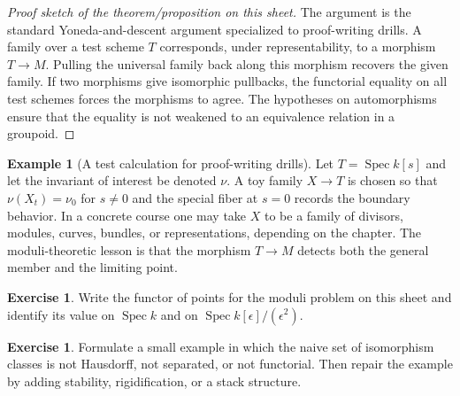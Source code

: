 \documentclass[11pt]{amsart}
\theoremstyle{definition}
\newtheorem{example}[theorem]{Example}
\newtheorem{exercise}[theorem]{Exercise}
\newcommand{\Spec}{\operatorname{Spec}}
\begin{document}
\begin{proof}[Proof sketch of the theorem/proposition on this sheet]
The argument is the standard Yoneda-and-descent argument specialized to proof-writing drills.  A family over a test scheme $T$ corresponds, under representability, to a morphism $T\to M$.  Pulling the universal family back along this morphism recovers the given family.  If two morphisms give isomorphic pullbacks, the functorial equality on all test schemes forces the morphisms to agree.  The hypotheses on automorphisms ensure that the equality is not weakened to an equivalence relation in a groupoid.
\end{proof}
\begin{example}[A test calculation for proof-writing drills]
Let $T=\Spec k[s]$ and let the invariant of interest be denoted $\nu$.  A toy family $X\to T$ is chosen so that $\nu(X_t)=\nu_0$ for $s\ne0$ and the special fiber at $s=0$ records the boundary behavior.  In a concrete course one may take $X$ to be a family of divisors, modules, curves, bundles, or representations, depending on the chapter.  The moduli-theoretic lesson is that the morphism $T\to M$ detects both the general member and the limiting point.
\end{example}
\begin{exercise}
Write the functor of points for the moduli problem on this sheet and identify its value on $\Spec k$ and on $\Spec k[\epsilon]/(\epsilon^2)$.
\end{exercise}
\begin{exercise}
Formulate a small example in which the naive set of isomorphism classes is not Hausdorff, not separated, or not functorial.  Then repair the example by adding stability, rigidification, or a stack structure.
\end{exercise}
\clearpage
\end{document}
